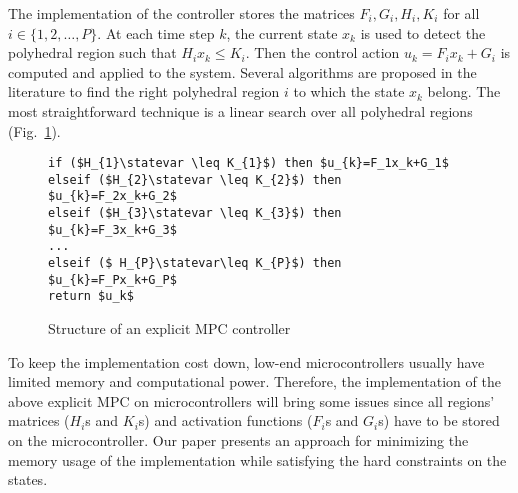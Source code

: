 The implementation of the controller stores the matrices $F_i,G_i,H_i,K_i$ for all $i\in\{1,2,\ldots,P\}$. 
At each time step $k$, the current state $x_k$ is used to detect the polyhedral region 
such that $H_i x_k\le K_i$. Then the control action $u_k = F_i x_k + G_i$ is computed and applied to the system.
Several algorithms are proposed in the literature \cite{Mnnigmann:2011,Jones:2006} to find the right polyhedral region $i$ to which the state $x_k$ belong. 
The most straightforward technique is a linear search over all polyhedral regions (Fig.~\ref{lst:caseof}).

\begin{figure}[t]
\begin{lstlisting}[mathescape=true,basicstyle=\small\ttfamily,morekeywords={if, then, elseif, return}]
if ($H_{1}\statevar \leq K_{1}$) then $u_{k}=F_1x_k+G_1$
elseif ($H_{2}\statevar \leq K_{2}$) then $u_{k}=F_2x_k+G_2$
elseif ($H_{3}\statevar \leq K_{3}$) then $u_{k}=F_3x_k+G_3$
...
elseif ($ H_{P}\statevar\leq K_{P}$) then $u_{k}=F_Px_k+G_P$
return $u_k$
\end{lstlisting}
\caption{Structure of an explicit MPC controller}
\label{lst:caseof}
\end{figure}

To keep the implementation cost down, low-end microcontrollers usually have
limited memory and computational power. Therefore, the implementation of the above
explicit MPC on microcontrollers will bring some issues since all regions'
matrices ($H_i$s and $K_i$s) and activation functions ($F_i$s and $G_i$s) have
to be stored on the microcontroller. Our paper presents an
approach for minimizing the memory usage of the implementation while satisfying
the hard constraints on the states.

